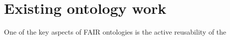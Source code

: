
\section{Existing ontology work}
\label{existingontologies}

One of the key aspects of FAIR ontologies is the active reusability of the 